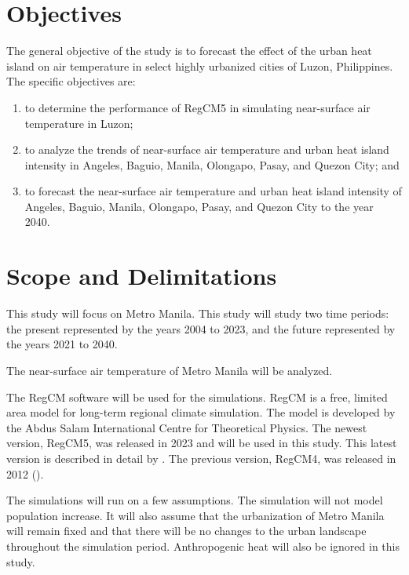 \section{Objectives}
	The general objective of the study is to forecast the effect of the urban heat island on air temperature in select highly urbanized cities of Luzon, Philippines.
	The specific objectives are:
	\begin{enumerate}
		\item to determine the performance of RegCM5 in simulating near-surface air temperature in Luzon;
		\item to analyze the trends of near-surface air temperature and urban heat island intensity in Angeles, Baguio, Manila, Olongapo, Pasay, and Quezon City; and
		\item to forecast the near-surface air temperature and urban heat island intensity of Angeles, Baguio, Manila, Olongapo, Pasay, and Quezon City to the year 2040.
	\end{enumerate}
	

\section{Scope and Delimitations}
	This study will focus on Metro Manila.
	This study will study two time periods: 
		the present represented by the years 2004 to 2023, 
		and the future represented by the years 2021 to 2040.
	
	The near-surface air temperature of Metro Manila will be analyzed.
	
	The RegCM software will be used for the simulations.
	RegCM is a free, limited area model for long-term regional climate simulation.
	The model is developed by the Abdus Salam International Centre for Theoretical Physics.
	The newest version, RegCM5, was released in 2023 and will be used in this study.
	This latest version is described in detail by \textcite{Giorgi2023}. 
	The previous version, RegCM4, was released in 2012 (\textcite{Giorgi2012}).
	
	The simulations will run on a few assumptions.
	The simulation will not model population increase.
	It will also assume that the urbanization of Metro Manila will remain fixed and that there will be no changes to the urban landscape throughout the simulation period.
	Anthropogenic heat will also be ignored in this study.